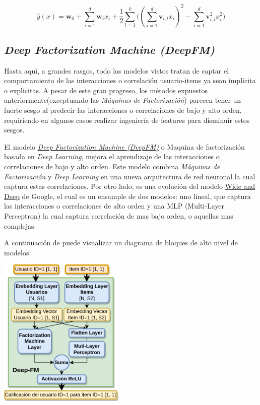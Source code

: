 \documentclass[11pt,a4paper,twoside]{thesis}
\begin{document}
\begin{equation*}
	\hat{y}(x) = \mathbf{w}_0 + \sum_{i=1}^d \mathbf{w}_i x_i + \frac{1}{2} \sum_{l=1}^k \big ((\sum_{i=1}^d \mathbf{v}_{i, l} x_i)^2 - \sum_{i=1}^d \mathbf{v}_{i, l}^2 x_i^2)
\end{equation*}


\subsection{\textit{Deep Factorization Machine (DeepFM)}}

Hasta aquí, a grandes rasgos, todo los modelos vistos tratan de captar el comportamiento de las interacciones o correlación usuario-items ya sean implícita o explicitas. A pesar de este gran progreso, los métodos expuestos anteriormente(exceptuando las \textit{Máquinas de Factorización}) parecen tener un fuerte sesgo al predecir las interacciones o correlaciones de bajo y alto orden, requiriendo en algunos casos realizar ingeniería de features para disminuir estos sesgos. 

El modelo \href{https://arxiv.org/pdf/1703.04247.pdf}{\textit{Deep Factorization Machine (DeepFM)}} o Maquina de factorización basada en \textit{Deep Learning}, mejora el aprendizaje de las interacciones o correlaciones de bajo y alto orden. Este modelo combina \textit{Máquinas de Factorización} y \textit{Deep Learning} en una nueva arquitectura de red neuronal la cual captura estas correlaciones. Por otro lado, es una evolución del modelo \href{https://arxiv.org/pdf/1606.07792.pdf}{Wide and Deep} de Google, el cual es un ensample de dos modelos: uno lineal, que captura las interacciones o correlaciones de alto orden y una MLP (Multi-Layer Perceptron) la cual captura correlación de mas bajo orden, o aquellas mas complejas.

A continuación de puede visualizar un diagrama de bloques de alto nivel de modelos:

\begin{center}
	\includegraphics[width=6cm]{./images/Deep-MF.png}
\end{center}
\end{document}
